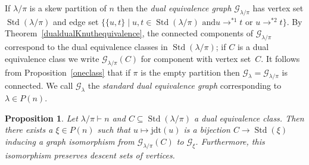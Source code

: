 \documentclass[10pt]{amsart}
\newtheorem{prop}[theo]{Proposition}
\theoremstyle{definition}
\newcommand{\jdt}{\mathrm{jdt}}
\DeclareMathOperator{\STD}{Std}
\begin{document}
If $\lambda/\pi$ is a skew partition of $n$ then the
\emph{dual equivalence graph} $\mathcal{G}_{\lambda/\pi}$
has vertex set $\STD(\lambda/\pi)$ and edge set
$\big\{\{u,t\}\mid u,t\in\STD(\lambda/\pi)\text{ and
$u\to^{*1}t$ or $u\to^{*2}t$}\big\}$. By Theorem~\ref{dualdualKnuthequivalence},
the connected components of $\mathcal{G}_{\lambda/\pi}$ correspond to the dual
equivalence classes in $\STD(\lambda/\pi)$; if $C$ is a dual equivalence class
we write $\mathcal{G}_{\lambda/\pi}(C)$ for component with vertex set~$C$.
It follows from Proposition~\ref{oneclass} that if $\pi$ is the empty partition
then $\mathcal{G}_{\lambda}=\mathcal{G}_{\lambda/\pi}$ is connected.
We call $\mathcal{G}_{\lambda}$ the \emph{standard dual equivalence graph}
corresponding to $\lambda\in P(n)$.
\begin{prop}\label{glambdapiconnectedcomps}
Let $\lambda/\pi\vdash n$ and $C\subseteq\STD(\lambda/\pi)$ a dual equivalence class.
Then there exists a $\xi\in P(n)$ such that $u\mapsto\jdt(u)$ is a bijection
$C\to\STD(\xi)$ inducing a graph isomorphism from
$\mathcal{G}_{\lambda/\pi}(C)$ to $\mathcal{G}_{\xi}$.
Furthermore, this isomorphism preserves descent sets of vertices.
\end{prop}
\end{document}
